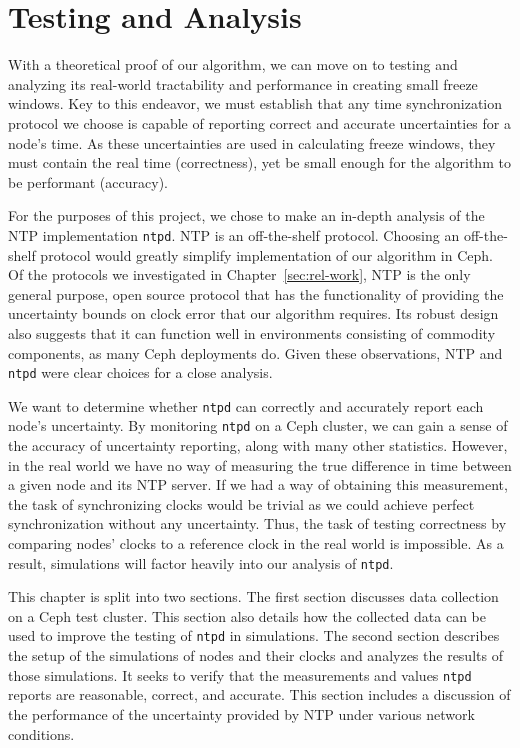 \chapter{Testing and Analysis}
\label{sec:results}

With a theoretical proof of our algorithm, we can move on to testing
and analyzing its real-world tractability and performance in creating
small freeze windows.  Key to
this endeavor, we must establish that any time synchronization
protocol we choose is capable of reporting correct and accurate
uncertainties for a node's time. As these uncertainties are used in
calculating freeze windows, they must contain the real time
(correctness), yet be small enough for the algorithm to be performant
(accuracy).

For the purposes of this project, we chose to make an in-depth
analysis of the NTP implementation \texttt{ntpd}. NTP is an
off-the-shelf protocol. Choosing an off-the-shelf protocol would
greatly simplify implementation of our algorithm in Ceph. Of the
protocols we investigated in Chapter~\ref{sec:rel-work}, NTP is the
only general purpose, open source protocol that has the
functionality of providing the uncertainty bounds on clock error 
that our algorithm requires. Its robust
design also suggests that it can function well in environments
consisting of commodity components, as many Ceph deployments do. 
Given these observations, NTP and \texttt{ntpd} were
clear choices for a close analysis.

We want to determine whether \texttt{ntpd} can correctly and
accurately report each node's uncertainty. By monitoring \texttt{ntpd}
on a Ceph cluster, we can gain a sense of the accuracy of uncertainty
reporting, along with many other statistics. However, in the real
world we have no way of measuring the true difference in time
between a given node and its NTP server. If we had a way of obtaining
this measurement, the task of synchronizing clocks would be trivial
as we could achieve perfect synchronization without any uncertainty.
Thus, the task of testing correctness by comparing nodes' clocks to a
reference clock in the real
world is impossible. As a result, simulations will factor heavily into
our analysis of \texttt{ntpd}.

This chapter is split into two sections. The first section discusses
data collection on a Ceph test cluster. This section also details how
the collected data can be used to improve the testing of \texttt{ntpd}
in simulations.  The second section describes the setup of the
simulations of nodes and their clocks and analyzes the results of those
simulations. It seeks to verify that the measurements and values
\texttt{ntpd} reports are reasonable, correct, and accurate. This
section includes a discussion of the performance of the uncertainty
provided by NTP under various network
conditions.

